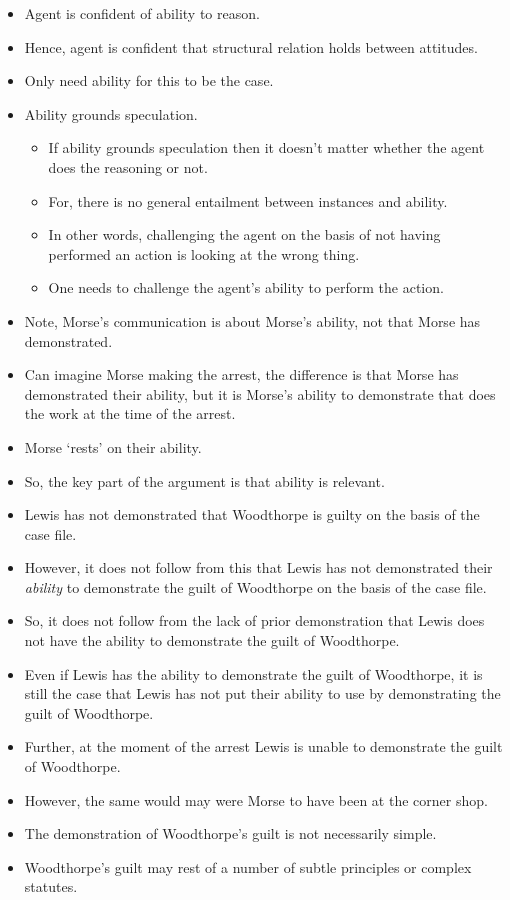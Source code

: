 \documentclass[10pt]{article}
\begin{document}
\begin{itemize}
\item Agent is confident of ability to reason.
\item Hence, agent is confident that structural relation holds between attitudes.
\item Only need ability for this to be the case.
\item Ability grounds speculation.
  \begin{itemize}
  \item If ability grounds speculation then it doesn't matter whether the agent does the reasoning or not.
  \item For, there is no general entailment between instances and ability.
  \item In other words, challenging the agent on the basis of not having performed an action is looking at the wrong thing.
  \item One needs to challenge the agent's ability to perform the action.
  \end{itemize}
\item Note, Morse's communication is about Morse's ability, not that Morse has demonstrated.
\item Can imagine Morse making the arrest, the difference is that Morse has demonstrated their ability, but it is Morse's ability to demonstrate that does the work at the time of the arrest.
\item Morse `rests' on their ability.
\item So, the key part of the argument is that ability is relevant.
\end{itemize}

\begin{itemize}
\item Lewis has not demonstrated that Woodthorpe is guilty on the basis of the case file.
\item However, it does not follow from this that Lewis has not demonstrated their \emph{ability} to demonstrate the guilt of Woodthorpe on the basis of the case file.
\item So, it does not follow from the lack of prior demonstration that Lewis does not have the ability to demonstrate the guilt of Woodthorpe.
\end{itemize}

\begin{itemize}
\item Even if Lewis has the ability to demonstrate the guilt of Woodthorpe, it is still the case that Lewis has not put their ability to use by demonstrating the guilt of Woodthorpe.
\item Further, at the moment of the arrest Lewis is unable to demonstrate the guilt of Woodthorpe.
\item However, the same would may were Morse to have been at the corner shop.
\item The demonstration of Woodthorpe's guilt is not necessarily simple.
\item Woodthorpe's guilt may rest of a number of subtle principles or complex statutes.
\end{itemize}
\end{document}
